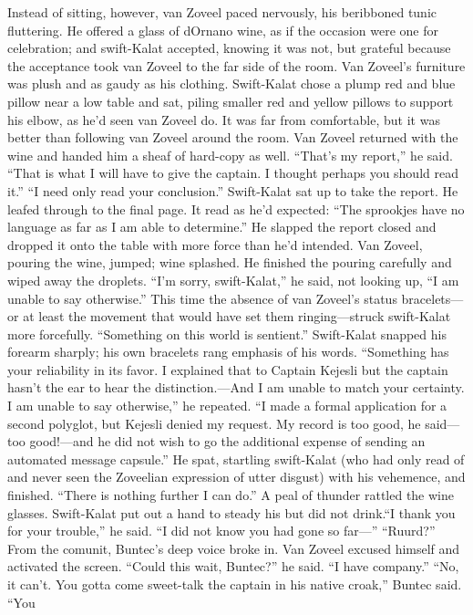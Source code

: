 \documentclass[9pt]{article}
\begin{document}
Instead of sitting, however, van Zoveel paced nervously, his beribboned tunic fluttering. He offered a
glass of dOrnano wine, as if the occasion were one for celebration; and swift-Kalat accepted, knowing it
was not, but grateful because the acceptance took van Zoveel to the far side of the room.
Van Zoveel’s furniture was plush and as gaudy as his clothing. Swift-Kalat chose a plump red and
blue pillow near a low table and sat, piling smaller red and yellow pillows to support his elbow, as he’d
seen van Zoveel do. It was far from comfortable, but it was better than following van Zoveel around the
room.
Van Zoveel returned with the wine and handed him a sheaf of hard-copy as well. “That’s my report,”
he said. “That is what I will have to give the captain. I thought perhaps you should read it.”
“I need only read your conclusion.” Swift-Kalat sat up to take the report. He leafed through to the
final page. It read as he’d expected: “The sprookjes have no language as far as I am able to
determine.” He slapped the report closed and dropped it onto the table with more force than he’d
intended.
Van Zoveel, pouring the wine, jumped; wine splashed. He finished the pouring carefully and wiped
away the droplets. “I’m sorry, swift-Kalat,” he said, not looking up, “I am unable to say otherwise.”
This time the absence of van Zoveel’s status bracelets—or at least the movement that would have set
them ringing—struck swift-Kalat more forcefully.
“Something on this world is sentient.” Swift-Kalat snapped his forearm sharply; his own bracelets
rang emphasis of his words.
“Something has your reliability in its favor. I explained that to Captain Kejesli but the captain hasn’t
the ear to hear the distinction.—And I am unable to match your certainty. I am unable to say otherwise,”
he repeated.
“I made a formal application for a second polyglot, but Kejesli denied my request. My record is too
good, he said—too good!—and he did not wish to go the additional expense of sending an automated
message capsule.” He spat, startling swift-Kalat (who had only read of and never seen the Zoveelian
expression of utter disgust) with his vehemence, and finished. “There is nothing further I can do.”
A peal of thunder rattled the wine glasses. Swift-Kalat put out a hand to steady his but did not drink.“I thank you for your trouble,” he said. “I did not know you had gone so far—”
“Ruurd?” From the comunit, Buntec’s deep voice broke in.
Van Zoveel excused himself and activated the screen. “Could this wait, Buntec?” he said. “I have
company.”
“No, it can’t. You gotta come sweet-talk the captain in his native croak,” Buntec said. “You
\end{document}
